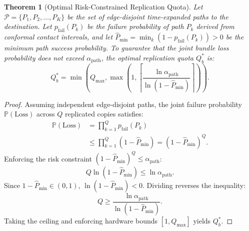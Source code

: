 \documentclass[preprint,12pt,5p,twocolumn]{elsarticle}
\newtheorem{theorem}{Theorem}
\begin{document}
\begin{theorem}[Optimal Risk-Constrained Replication Quota]
\label{thm:quota}
Let $\mathcal{P} = \{P_1, P_2, \dots, P_K\}$ be the set of edge-disjoint time-expanded paths to the destination. Let $p_{\text{fail}}(P_k)$ be the failure probability of path $P_k$ derived from conformal contact intervals, and let $\hat{P}_{\min} = \min_k (1 - p_{\text{fail}}(P_k)) > 0$ be the minimum path success probability. To guarantee that the joint bundle loss probability does not exceed $\alpha_{\text{path}}$, the optimal replication quota $Q_b^*$ is:
\begin{equation}
Q_b^* = \min\left(Q_{\max}, \max\left(1, \left\lceil \frac{\ln \alpha_{\text{path}}}{\ln (1 - \hat{P}_{\min})} \right\rceil \right)\right).
\end{equation}
\end{theorem}
\begin{proof}
Assuming independent edge-disjoint paths, the joint failure probability $\mathbb{P}(\text{Loss})$ across $Q$ replicated copies satisfies:
\begin{equation}
\begin{aligned}
\mathbb{P}(\text{Loss}) &= \prod_{k=1}^Q p_{\text{fail}}(P_k) \\
&\le \prod_{k=1}^Q (1 - \hat{P}_{\min}) = (1 - \hat{P}_{\min})^Q.
\end{aligned}
\end{equation}
Enforcing the risk constraint $(1 - \hat{P}_{\min})^Q \le \alpha_{\text{path}}$:
\begin{equation}
Q \ln(1 - \hat{P}_{\min}) \le \ln \alpha_{\text{path}}.
\end{equation}
Since $1 - \hat{P}_{\min} \in (0, 1)$, $\ln(1 - \hat{P}_{\min}) < 0$. Dividing reverses the inequality:
\begin{equation}
Q \ge \frac{\ln \alpha_{\text{path}}}{\ln(1 - \hat{P}_{\min})}.
\end{equation}
Taking the ceiling and enforcing hardware bounds $[1, Q_{\max}]$ yields $Q_b^*$.
\end{proof}
\end{document}
